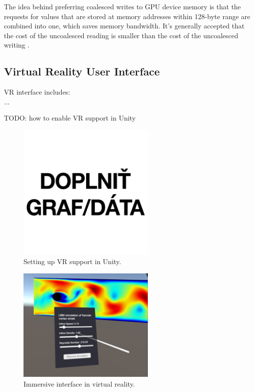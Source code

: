 The idea behind preferring coalesced writes to GPU device memory is that the requests for values that are stored at memory addresses within 128-byte range are combined into one, which saves memory bandwidth. It's generally accepted that the cost of the uncoalesced reading is smaller than the cost of the uncoalesced writing \cite{tranPerformanceOptimization3D2017}.

\subsection{Virtual Reality User Interface}

VR interface includes: \\ 

...

TODO: how to enable VR support in Unity

\begin{figure}[!ht]
	\centering
	\includegraphics[width=0.6\textwidth]{figures/empty.jpg}
	\caption{Setting up VR support in Unity.}
	\label{fig:unity-vr-support}
\end{figure}

\begin{figure}[!ht]
	\centering
	\includegraphics[width=0.6\textwidth]{figures/unity-vr-ui.jpeg}
	\caption{Immersive interface in virtual reality.}
	\label{fig:unity-vr-ui}
\end{figure}

